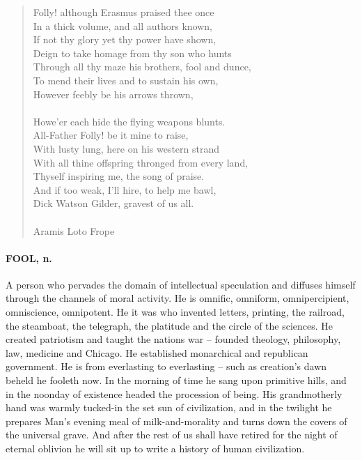 \documentclass[11pt]{article}
\begin{document}
\begin{quote}   Folly! although Erasmus praised thee once \\
      In a thick volume, and all authors known, \\
      If not thy glory yet thy power have shown, \\
  Deign to take homage from thy son who hunts \\
  Through all thy maze his brothers, fool and dunce, \\
      To mend their lives and to sustain his own, \\
      However feebly be his arrows thrown, \\
 \\
  Howe'er each hide the flying weapons blunts. \\
  All-Father Folly! be it mine to raise, \\
      With lusty lung, here on his western strand \\
      With all thine offspring thronged from every land, \\
  Thyself inspiring me, the song of praise. \\
  And if too weak, I'll hire, to help me bawl, \\
  Dick Watson Gilder, gravest of us all. \\
 \\
Aramis Loto Frope \end{quote}


\paragraph{FOOL, n.}  A person who pervades the domain of intellectual speculation
and diffuses himself through the channels of moral activity.  He is
omnific, omniform, omnipercipient, omniscience, omnipotent.  He it was
who invented letters, printing, the railroad, the steamboat, the
telegraph, the platitude and the circle of the sciences.  He created
patriotism and taught the nations war -- founded theology, philosophy,
law, medicine and Chicago.  He established monarchical and republican
government.  He is from everlasting to everlasting -- such as
creation's dawn beheld he fooleth now.  In the morning of time he sang
upon primitive hills, and in the noonday of existence headed the
procession of being.  His grandmotherly hand was warmly tucked-in the
set sun of civilization, and in the twilight he prepares Man's evening
meal of milk-and-morality and turns down the covers of the universal
grave.  And after the rest of us shall have retired for the night of
eternal oblivion he will sit up to write a history of human
civilization.
\end{document}
